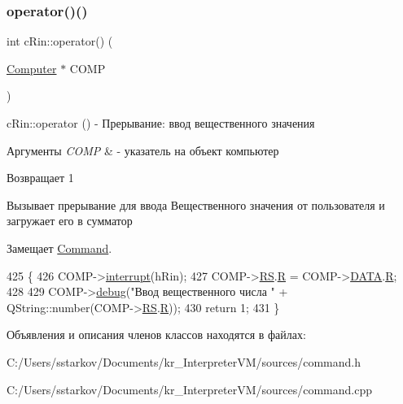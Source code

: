 \subsubsection{\texorpdfstring{operator()()}{operator()()}}
{\footnotesize\ttfamily int c\+Rin\+::operator() (\begin{DoxyParamCaption}\item[{\hyperlink{class_computer}{Computer} $\ast$}]{C\+O\+MP }\end{DoxyParamCaption})\hspace{0.3cm}{\ttfamily [virtual]}}



c\+Rin\+::operator () -\/ Прерывание\+: ввод вещественного значения 


\begin{DoxyParams}{Аргументы}
{\em C\+O\+MP} & -\/ указатель на объект компьютер \\
\hline
\end{DoxyParams}
\begin{DoxyReturn}{Возвращает}
1
\end{DoxyReturn}
Вызывает прерывание для ввода Вещественного значения от пользователя и загружает его в сумматор 

Замещает \hyperlink{class_command_a79939b66f3de892e91d7710844294716}{Command}.


\begin{DoxyCode}
425 \{
426     COMP->\hyperlink{class_computer_aa57b0ed2f3a9b168c2924174ec524bd4}{interrupt}(hRin);
427     COMP->\hyperlink{class_computer_a874503110664b3cf821118d2ce9c2b96}{RS}.\hyperlink{union_computer_1_1data_acbf8c96e22bd094bcbb4014818e3570d}{R} = COMP->\hyperlink{class_computer_adb154047da2156e4419af3b3a4a766b7}{DATA}.\hyperlink{union_computer_1_1data_acbf8c96e22bd094bcbb4014818e3570d}{R};
428 
429     COMP->\hyperlink{class_computer_a10ca6c6b200630119201de16d7368e0f}{debug}(\textcolor{stringliteral}{"Ввод вещественного числа "} + QString::number(COMP->\hyperlink{class_computer_a874503110664b3cf821118d2ce9c2b96}{RS}.\hyperlink{union_computer_1_1data_acbf8c96e22bd094bcbb4014818e3570d}{R}));
430     \textcolor{keywordflow}{return} 1;
431 \}
\end{DoxyCode}


Объявления и описания членов классов находятся в файлах\+:\begin{DoxyCompactItemize}
\item 
C\+:/\+Users/sstarkov/\+Documents/kr\+\_\+\+Interpreter\+V\+M/sources/command.\+h\item 
C\+:/\+Users/sstarkov/\+Documents/kr\+\_\+\+Interpreter\+V\+M/sources/command.\+cpp\end{DoxyCompactItemize}
